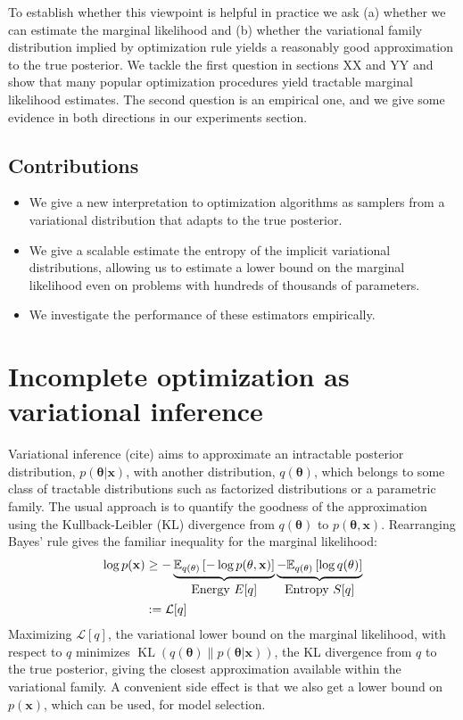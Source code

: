 \documentclass[]{article}
\newcommand{\vx}{\mathbf{x}}
\newcommand{\expectargs}[2]{\mathbb{E}_{#1} \left[ {#2} \right]}
\newcommand{\varL}{\mathcal{L}}
\DeclareMathOperator{\KLop}{KL}
\newcommand{\KL}[2]{\KLop \left(#1 \middle \| #2 \right)}
\newcommand{\data}{\vx}
\newcommand{\params}{\mathbf{\theta}}
\newcommand{\jointdist}{p(\params , \data)}
\newcommand{\posterior}{p(\params | \data)}
\begin{document}
To establish whether this viewpoint is helpful in practice we ask (a) whether we
can estimate the marginal likelihood and (b) whether the variational family
distribution implied by optimization rule yields a reasonably good approximation
to the true posterior. We tackle the first question in sections XX and YY and
show that many popular optimization procedures yield tractable marginal
likelihood estimates. The second question is an empirical one, and we give some
evidence in both directions in our experiments section.

\subsection{Contributions}
\begin{itemize}
\item We give a new interpretation to optimization algorithms as samplers from a variational distribution that adapts to the true posterior.
\item We give a scalable estimate the entropy of the implicit variational distributions, allowing us to estimate a lower bound on the marginal likelihood even on problems with hundreds of thousands of parameters.
\item We investigate the performance of these estimators empirically.
\end{itemize}

\section{Incomplete optimization as variational inference}

Variational inference (cite) aims to approximate an intractable posterior
distribution, $\posterior$, with another distribution, $q(\params)$,
which belongs to some class of tractable distributions such as factorized
distributions or a parametric family. The usual approach is to quantify the
goodness of the approximation using the Kullback-Leibler (KL) divergence from
$q(\params)$ to $\jointdist$. Rearranging Bayes' rule gives the familiar
inequality for the marginal likelihood:
%
\begin{align}
\log p(\data)
& \geq - \underbrace{\expectargs{q(\params)}{ -\log \jointdist }}_{\textnormal{\normalsize Energy $E[q]$}}
         \underbrace{- \expectargs{q(\params)}{\log  q(\params)}}_{\textnormal{\normalsize Entropy $S[q]$}} \nonumber \\
& := \varL[q] \label{eq:varbound}
\end{align}
%
Maximizing $\varL[q]$, the variational lower bound on the marginal likelihood,
with respect to $q$ minimizes $\KL{q(\params)}{\posterior}$, the KL
divergence from $q$ to the true posterior, giving the closest approximation
available within the variational family. A convenient side effect is that we
also get a lower bound on $p(\data)$, which can be used, for model selection.
\end{document}
